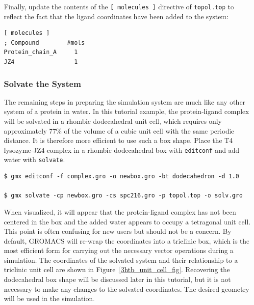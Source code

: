\documentclass[9pt,tutorial,pubversion]{livecoms}
\begin{document}
Finally, update the contents of the \texttt{[ molecules ]} directive of \texttt{topol.top} to reflect the fact that the ligand coordinates have been added to the system:

\begin{lstlisting}[basicstyle=\small\ttfamily]
[ molecules ]
; Compound        #mols
Protein_chain_A     1
JZ4                 1
\end{lstlisting}

\subsubsection{Solvate the System} \label{complex_solv}

The remaining steps in preparing the simulation system are much like any other system of a protein in water. In this tutorial example, the protein-ligand complex will be solvated in a rhombic dodecahedral unit cell, which requires only approximately 77\% of the volume of a cubic unit cell with the same periodic distance. It is therefore more efficient to use such a box shape. Place the T4 lysozyme-JZ4 complex in a rhombic dodecahedral box with \texttt{editconf} and add water with \texttt{solvate}.

\begin{lstlisting}
$ gmx editconf -f complex.gro -o newbox.gro -bt dodecahedron -d 1.0

$ gmx solvate -cp newbox.gro -cs spc216.gro -p topol.top -o solv.gro
\end{lstlisting}

When visualized, it will appear that the protein-ligand complex has not been centered in the box and the added water appears to occupy a tetragonal unit cell. This point is often confusing for new users but should not be a concern. By default, GROMACS will re-wrap the coordinates into a triclinic box, which is the most efficient form for carrying out the necessary vector operations during a simulation. The coordinates of the solvated system and their relationship to a triclinic unit cell are shown in Figure~\ref{3htb_unit_cell_fig}. Recovering the dodecahedral box shape will be discussed later in this tutorial, but it is not necessary to make any changes to the solvated coordinates. The desired geometry will be used in the simulation.
\end{document}
